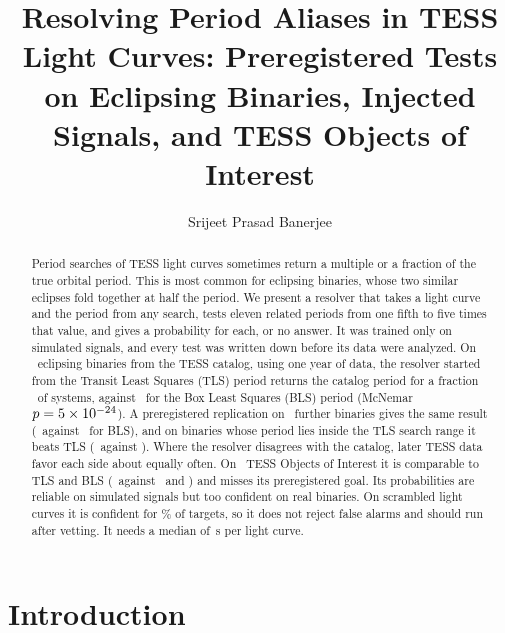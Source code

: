 \documentclass[twocolumn,linenumbers]{aastex701}
\begin{document}
\title{Resolving Period Aliases in TESS Light Curves: Preregistered Tests on Eclipsing Binaries, Injected Signals, and TESS Objects of Interest}

\author[0009-0009-5889-9550]{Srijeet Prasad Banerjee}

\begin{abstract}
Period searches of TESS light curves sometimes return a multiple or a fraction of the true orbital period. This is most common for eclipsing binaries, whose two similar eclipses fold together at half the period. We present a resolver that takes a light curve and the period from any search, tests eleven related periods from one fifth to five times that value, and gives a probability for each, or no answer. It was trained only on simulated signals, and every test was written down before its data were analyzed. On \bFiveN\ eclipsing binaries from the TESS catalog, using one year of data, the resolver started from the Transit Least Squares (TLS) period returns the catalog period for a fraction \bFiveAcc\ of systems, against \bFiveRawBls\ for the Box Least Squares (BLS) period (McNemar $p=5\times10^{-24}$). A preregistered replication on \bSixN\ further binaries gives the same result (\bSixAcc\ against \bSixBls\ for BLS), and on binaries whose period lies inside the TLS search range it beats TLS (\bSixHtwoAcc\ against \bSixHtwoTls). Where the resolver disagrees with the catalog, later TESS data favor each side about equally often. On \bTwoN\ TESS Objects of Interest it is comparable to TLS and BLS (\bTwoAcc\ against \bTwoRawTls\ and \bTwoRawBls) and misses its preregistered goal. Its probabilities are reliable on simulated signals but too confident on real binaries. On scrambled light curves it is confident for \faScrVtwo\% of targets, so it does not reject false alarms and should run after vetting. It needs a median of \bFourTotalMed\,s per light curve.
\end{abstract}


\section{Introduction} \label{sec:intro}
\end{document}
